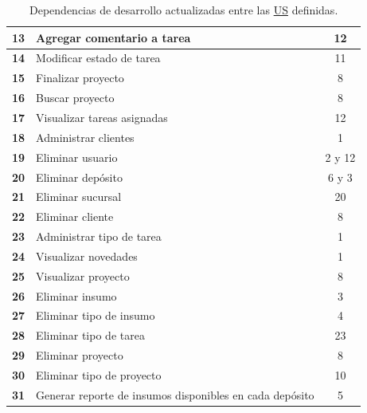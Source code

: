 \documentclass[a4paper, 12pt,twoside]{report}  %
\numberwithin{equation}{subsection} %
\begin{document}
\begin{table}[h!]
\begin{tabular}{ |p{0.5cm}|p{10cm}|c|  }
		\hline
		\textbf{13} & \cellcolor{marca_US_realizada_anterior}Agregar comentario a tarea & 12 \\
		\hline
		\textbf{14} & \cellcolor{marca_US_realizada_anterior}Modificar estado de tarea & 11 \\
		\hline
		\textbf{15} & \cellcolor{marca_US_realizada_anterior}Finalizar proyecto & 8 \\
		\hline
		\textbf{16} & \cellcolor{marca_US_realizada_anterior}Buscar proyecto & 8 \\
		\hline
		\textbf{17} & \cellcolor{marca_US_realizada_anterior}Visualizar tareas asignadas & 12 \\
		\hline
		\textbf{18} & \cellcolor{marca_US_realizada_anterior}Administrar clientes & 1 \\
		\hline
		\textbf{19} & \cellcolor{marca_US_realizada}Eliminar usuario & 2 y 12 \\
		\hline
		\textbf{20} & \cellcolor{marca_US_realizada}Eliminar depósito & 6 y 3 \\
		\hline
		\textbf{21} & \cellcolor{marca_US_realizada}Eliminar sucursal & 20 \\
		\hline
		\textbf{22} & \cellcolor{marca_US_realizada}Eliminar cliente & 8 \\
		\hline
		\textbf{23} & \cellcolor{marca_US_realizada_anterior}Administrar tipo de tarea & 1 
		\\
		\hline
		\textbf{24} & \cellcolor{marca_US_realizada_anterior}Visualizar novedades & 1 
		\\
		\hline
		\textbf{25} & \cellcolor{marca_US_realizada_anterior}Visualizar proyecto & 8 
		\\
		\hline
		\textbf{26} & \cellcolor{marca_US_realizada}Eliminar insumo & 3 
		\\
		\hline
		\textbf{27} & \cellcolor{marca_US_realizada}Eliminar tipo de insumo & 4 
		\\
		\hline
		\textbf{28} & \cellcolor{marca_US_realizada}Eliminar tipo de tarea & 23 
		\\
		\hline
		\textbf{29} & \cellcolor{marca_US_realizada}Eliminar proyecto & 8 
		\\
		\hline
		\textbf{30} & \cellcolor{marca_US_realizada}Eliminar tipo de proyecto & 10 
		\\
		\hline
		\textbf{31} & \cellcolor{marca_US_realizada}Generar reporte de insumos disponibles en cada depósito & 5 
		\\
		\hline
	\end{tabular}
	\caption{Dependencias de desarrollo actualizadas entre las \protect\hyperlink{US}{US} definidas.}
	\label{tabla_dependencias_us_it5}
\end{table}
\end{document}
